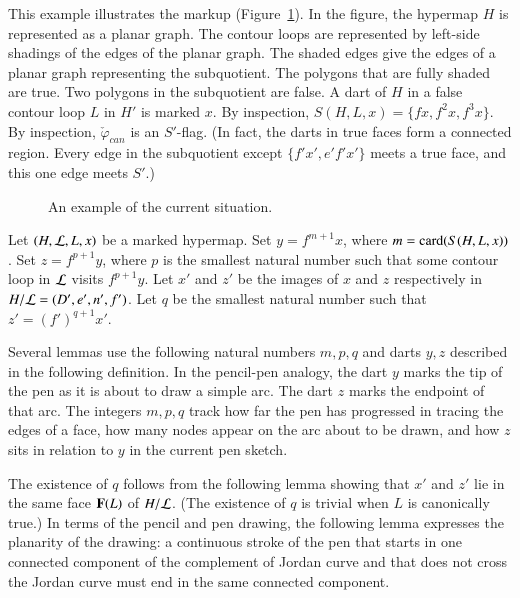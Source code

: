 \begin{example}[illustration]\label{ex:graph-gen}  
  This example illustrates the markup (Figure~\ref{fig:graph-gen}).
  In the figure, the hypermap $H$ is represented as a planar graph.
  The contour loops are represented by left-side shadings of the edges
  of the planar graph.  The shaded edges give the edges of a planar
  graph representing the subquotient.  The polygons that are fully shaded
  are true.  Two polygons in the subquotient are false.  A dart of $H$ in
  a false contour loop $L$ in $H'$ is marked $x$.  By inspection,
  $S(H,L,x)=\{f x,f^2 x,f^3 x\}$.  By inspection,
  $\check\varphi_{can}$ is an $S'$-flag.  (In fact, the darts in true
  faces form a connected region.  Every edge in the subquotient except
  $\{f' x', e' f' x'\}$ meets a true face, and this one edge meets
  $S'$.)
\end{example}

\begin{figure}[htb]
\centering
{}
\caption{An example of the current situation.}
\label{fig:graph-gen}
\end{figure}



\begin{definition}[$m$,~$p$,~$q$,~$y$,~$z$]\label{def:yz}
Let $(H,{\cal L},L,x)$ be a marked hypermap.
Set  $y = f^{m+1} x$, where $m = {\operatorname{card}}(S(H,L,x))$.
  Set
$z=f^{p+1} y$, where $p$ is the smallest natural number 
such that some contour loop in ${\cal L}$ visits $f^{p+1} y$.
Let $x'$ and $z'$ be the images of $x$ and $z$ respectively in $H/{\cal L} = (D',e',n',f')$.
Let $q$ be the smallest natural number such that $z' = (f')^{q+1} x'$.  
\end{definition}

Several lemmas use the following natural numbers $m,p,q$ and darts
$y,z$ described in the following definition.  In the pencil-pen
analogy, the dart $y$ marks the tip of the pen as it is about to draw
a simple arc. The dart $z$ marks the endpoint of that arc.  The
integers $m,p,q$ track how far the pen has progressed in tracing the
edges of a face, how many nodes appear on the arc about to be drawn,
and how $z$ sits in relation to $y$ in the current pen sketch.

The existence of $q$ follows from the following lemma showing that
$x'$ and $z'$ lie in the same face ${\mathbf F}(L)$ of $H/{\cal L}$.  (The
existence of $q$ is trivial when $L$ is canonically true.)  In terms
of the pencil and pen drawing, the following
lemma expresses the planarity of the drawing:
a continuous stroke of the pen that starts in one connected component of
the complement of Jordan curve and that does not cross the Jordan
curve must end in the same connected component.


